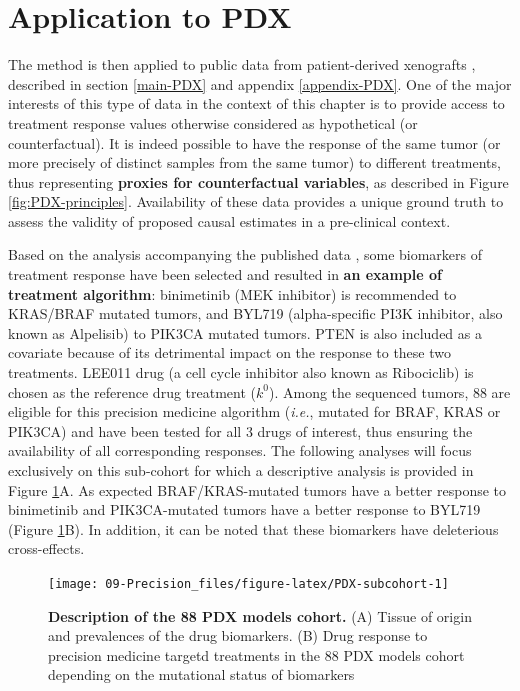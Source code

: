 \documentclass[a4paper,12pt,twoside,onecolumn,openright,final,oldfontcommands]{memoir}
\begin{document}
\section{Application to PDX}\label{application-to-pdx}

The method is then applied to public data from patient-derived
xenografts \citep{gao2015high}, described in section \ref{main-PDX} and
appendix \ref{appendix-PDX}. One of the major interests of this type of
data in the context of this chapter is to provide access to treatment
response values otherwise considered as hypothetical (or
counterfactual). It is indeed possible to have the response of the same
tumor (or more precisely of distinct samples from the same tumor) to
different treatments, thus representing \textbf{proxies for
counterfactual variables}, as described in Figure
\ref{fig:PDX-principles}. Availability of these data provides a unique
ground truth to assess the validity of proposed causal estimates in a
pre-clinical context.

Based on the analysis accompanying the published data
\citep{gao2015high}, some biomarkers of treatment response have been
selected and resulted in \textbf{an example of treatment algorithm}:
binimetinib (MEK inhibitor) is recommended to KRAS/BRAF mutated tumors,
and BYL719 (alpha-specific PI3K inhibitor, also known as Alpelisib) to
PIK3CA mutated tumors. PTEN is also included as a covariate because of
its detrimental impact on the response to these two treatments. LEE011
drug (a cell cycle inhibitor also known as Ribociclib) is chosen as the
reference drug treatment (\(k^0\)). Among the sequenced tumors, 88 are
eligible for this precision medicine algorithm (\emph{i.e.}, mutated for
BRAF, KRAS or PIK3CA) and have been tested for all 3 drugs of interest,
thus ensuring the availability of all corresponding responses. The
following analyses will focus exclusively on this sub-cohort for which a
descriptive analysis is provided in Figure \ref{fig:PDX-subcohort}A. As
expected BRAF/KRAS-mutated tumors have a better response to binimetinib
and PIK3CA-mutated tumors have a better response to BYL719 (Figure
\ref{fig:PDX-subcohort}B). In addition, it can be noted that these
biomarkers have deleterious cross-effects.

\begin{figure}

{\centering \texttt{[image: 09-Precision\_files/figure-latex/PDX-subcohort-1]} 

}

\caption[Description of the 88 PDX models cohort]{\textbf{Description of the 88 PDX models
cohort.} (A) Tissue of origin and prevalences of the drug biomarkers.
(B) Drug response to precision medicine targetd treatments in the 88 PDX
models cohort depending on the mutational status of biomarkers}\label{fig:PDX-subcohort}
\end{figure}
\end{document}
